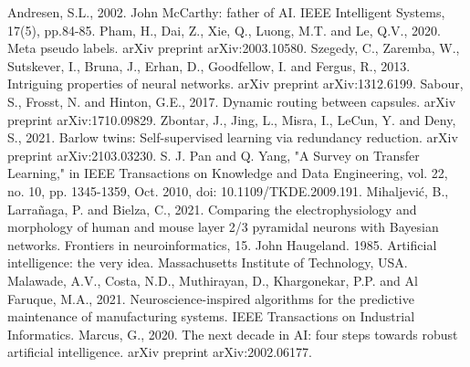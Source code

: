 \documentclass{article}
\begin{document}
\begin{thebibliography}{99}
     Andresen, S.L., 2002. John McCarthy: father of AI. IEEE Intelligent Systems, 17(5), pp.84-85.
     Pham, H., Dai, Z., Xie, Q., Luong, M.T. and Le, Q.V., 2020. Meta pseudo labels. arXiv preprint arXiv:2003.10580.
     Szegedy, C., Zaremba, W., Sutskever, I., Bruna, J., Erhan, D., Goodfellow, I. and Fergus, R., 2013. Intriguing properties of neural networks. arXiv preprint arXiv:1312.6199.
     Sabour, S., Frosst, N. and Hinton, G.E., 2017. Dynamic routing between capsules. arXiv preprint arXiv:1710.09829.
     Zbontar, J., Jing, L., Misra, I., LeCun, Y. and Deny, S., 2021. Barlow twins: Self-supervised learning via redundancy reduction. arXiv preprint arXiv:2103.03230.
     S. J. Pan and Q. Yang, "A Survey on Transfer Learning," in IEEE Transactions on Knowledge and Data Engineering, vol. 22, no. 10, pp. 1345-1359, Oct. 2010, doi: 10.1109/TKDE.2009.191.
     Mihaljević, B., Larrañaga, P. and Bielza, C., 2021. Comparing the electrophysiology and morphology of human and mouse layer 2/3 pyramidal neurons with Bayesian networks. Frontiers in neuroinformatics, 15.
     John Haugeland. 1985. Artificial intelligence: the very idea. Massachusetts Institute of Technology, USA.
     Malawade, A.V., Costa, N.D., Muthirayan, D., Khargonekar, P.P. and Al Faruque, M.A., 2021. Neuroscience-inspired algorithms for the predictive maintenance of manufacturing systems. IEEE Transactions on Industrial Informatics.
     Marcus, G., 2020. The next decade in AI: four steps towards robust artificial intelligence. arXiv preprint arXiv:2002.06177.

\end{thebibliography}
\end{document}
